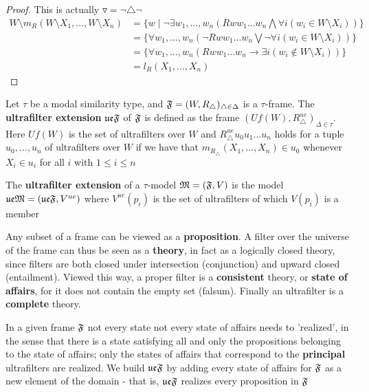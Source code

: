 \documentclass[11pt]{article}
\newcommand{\ue}{\fu\fe}
\begin{document}
\begin{proof}
This is actually \(\triangledown=\neg\triangle\neg\)
\begin{align*}
W\setminus m_R(W\setminus X_1,\dots,W\setminus X_n)&=
\{w\mid\neg\exists w_1,\dots,w_n(Rww_1\dots w_n\bigwedge\forall i(w_i\in W\setminus X_i))\}\\
&=\{\forall w_1,\dots,w_n(\neg Rww_1\dots w_n\bigvee\neg\forall i(w_i\in W\setminus X_i))\}\\
&=\{\forall w_1,\dots,w_n(Rww_1\dots w_n\to\exists i(w_i\not\in W\setminus X_i))\}\\
&=l_R(X_1,\dots,X_n)
\end{align*}
\end{proof}
\begin{definition}
Let \(\tau\) be a modal similarity type, and
\(\mathfrak{F}=(W,R_{\triangle})_{ \triangle\in\Delta}\) is a \(\tau\)-frame. The
\textbf{ultrafilter extension} \(\mathfrak{u}\mathfrak{e}\mathfrak{F}\) of \(\mathfrak{F}\) is defined as the frame
\((Uf(W),R_{\triangle}^{ue})_{\Delta\in\tau}\). Here \(Uf(W)\) is the set of
ultrafilters over \(W\) and \(R_{\triangle}^{ue}u_0u_1\dots u_n\) holds for
a tuple \(u_0,\dots,u_n\) of ultrafilters over \(W\) if we have that
\(m_{R_{\triangle}}(X_1,\dots,X_n)\in u_0\) whenever \(X_i\in u_i\) for all
\(i\) with \(1\le i\le n\)

The \textbf{ultrafilter extension} of a \(\tau\)-model \(\mathfrak{M}=(\mathfrak{F},V)\) is the model
\(\mathfrak{u}\mathfrak{e}\mathfrak{M}=(\mathfrak{u}\mathfrak{e}\mathfrak{F},V^{ue})\) where \(V^{ue}(p_i)\) is the set of
ultrafilters of which \(V(p_i)\) is a member
\end{definition}

Any subset of a frame can be viewed as a \textbf{proposition}. A filter over the
universe of the frame can thus be seen as a \textbf{theory}, in fact as a logically
closed theory, since filters are both closed under intersection
(conjunction) and upward closed (entailment). Viewed this way, a proper
filter is a \textbf{consistent} theory, or \textbf{state of affairs},
for it does not contain the empty set (falsum).
Finally an ultrafilter is a \textbf{complete} theory.

In a given frame \(\mathfrak{F}\) not every state not every state of affairs needs to
'realized', in the sense that there is a state satisfying all and only the
propositions belonging to the state of affairs; only the states of affairs
that correspond to the \textbf{principal} ultrafilters are realized. We build
\(\ue\fF\) by adding every state of affairs for \(\mathfrak{F}\) as a new element of
the domain - that is, \(\ue\fF\) realizes every proposition in \(\mathfrak{F}\)
\end{document}
